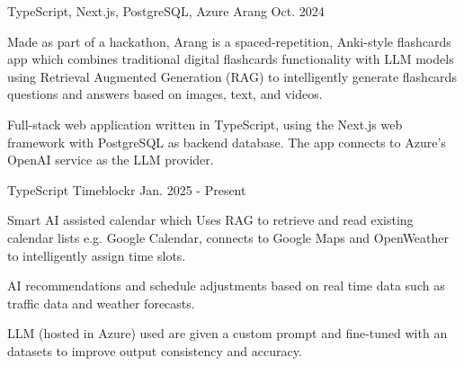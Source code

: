 
\begin{cventries}

  \cventry
    {TypeScript, Next.js, PostgreSQL, Azure} %
    {Arang} %
    {} %
    {Oct. 2024} %
    {
      \begin{cvitems} %
        \item {Made as part of a hackathon, Arang is a spaced-repetition, Anki-style flashcards app which combines traditional digital flashcards
functionality with LLM models using Retrieval Augmented Generation (RAG) to intelligently generate
flashcards questions and answers based on images, text, and videos.}
        \item {Full-stack web application written in TypeScript, using the Next.js web framework with PostgreSQL as
backend database. The app connects to Azure's OpenAI service as the LLM provider.}
      \end{cvitems}
    }

  \cventry
    {TypeScript} %
    {Timeblockr} %
    {} %
    {Jan. 2025 - Present} %
    {
      \begin{cvitems} %
        \item {Smart AI assisted calendar which Uses RAG to retrieve and read existing calendar lists e.g. Google Calendar, connects to Google Maps and OpenWeather to intelligently
assign time slots.}
        \item {AI recommendations and schedule adjustments based on real time data such as traffic data and weather
        forecasts.}
        \item {LLM (hosted in Azure) used are given a custom prompt and fine-tuned with an datasets to improve output consistency and accuracy.}
      \end{cvitems}
    }

\end{cventries}
